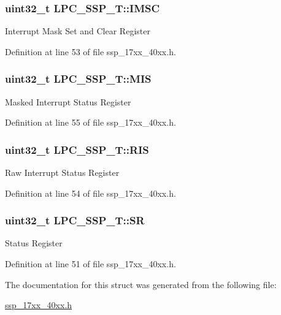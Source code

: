 \subsubsection[{\texorpdfstring{I\+M\+SC}{IMSC}}]{ uint32\+\_\+t L\+P\+C\+\_\+\+S\+S\+P\+\_\+\+T\+::\+I\+M\+SC}\hypertarget{structLPC__SSP__T_a5969572eaab7a02f4bbd7c898f93ca73}{}\label{structLPC__SSP__T_a5969572eaab7a02f4bbd7c898f93ca73}
Interrupt Mask Set and Clear Register 

Definition at line 53 of file ssp\+\_\+17xx\+\_\+40xx.\+h.

\subsubsection[{\texorpdfstring{M\+IS}{MIS}}]{ uint32\+\_\+t L\+P\+C\+\_\+\+S\+S\+P\+\_\+\+T\+::\+M\+IS}\hypertarget{structLPC__SSP__T_aa4b72809de09f83335e72d0d0844a90b}{}\label{structLPC__SSP__T_aa4b72809de09f83335e72d0d0844a90b}
Masked Interrupt Status Register 

Definition at line 55 of file ssp\+\_\+17xx\+\_\+40xx.\+h.

\subsubsection[{\texorpdfstring{R\+IS}{RIS}}]{ uint32\+\_\+t L\+P\+C\+\_\+\+S\+S\+P\+\_\+\+T\+::\+R\+IS}\hypertarget{structLPC__SSP__T_a0aa742f8d7d4b2e2a6038b01dbc1aa5b}{}\label{structLPC__SSP__T_a0aa742f8d7d4b2e2a6038b01dbc1aa5b}
Raw Interrupt Status Register 

Definition at line 54 of file ssp\+\_\+17xx\+\_\+40xx.\+h.

\subsubsection[{\texorpdfstring{SR}{SR}}]{ uint32\+\_\+t L\+P\+C\+\_\+\+S\+S\+P\+\_\+\+T\+::\+SR}\hypertarget{structLPC__SSP__T_a5f6421682b9a321abc8d4c91a6dbd964}{}\label{structLPC__SSP__T_a5f6421682b9a321abc8d4c91a6dbd964}
Status Register 

Definition at line 51 of file ssp\+\_\+17xx\+\_\+40xx.\+h.



The documentation for this struct was generated from the following file\+:\begin{DoxyCompactItemize}
\item 
\hyperlink{ssp__17xx__40xx_8h}{ssp\+\_\+17xx\+\_\+40xx.\+h}\end{DoxyCompactItemize}
